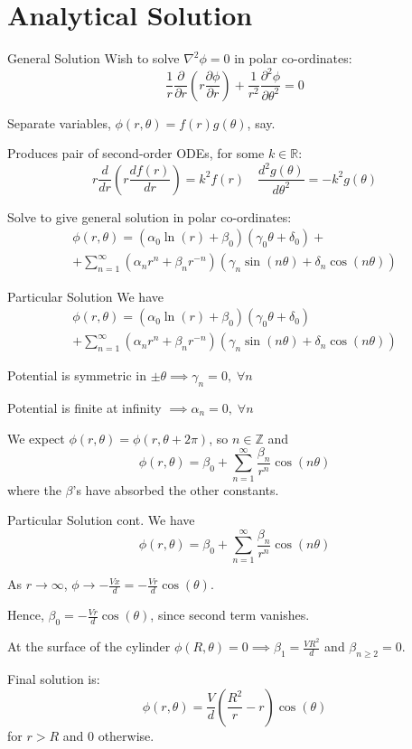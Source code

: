 \documentclass{beamer}
\newcommand{\be}{\begin{equation}}
\newcommand{\ee}{\end{equation}}
\begin{document}
\section{Analytical Solution}

\begin{frame}{General Solution}
Wish to solve $\nabla ^2 \phi = 0$ in polar co-ordinates:
%
\be
\frac{1}{r}\frac{\partial}{\partial r}(r \frac{\partial \phi}{\partial r})
+ \frac{1}{r^2}\frac{\partial ^2 \phi}{\partial \theta^2} = 0
\ee

Separate variables, $\phi(r,\theta)=f(r)g(\theta)$, say.

Produces pair of second-order ODEs, for some $k \in \mathbb{R}$:
%
\be
r\frac{d}{dr}(r \frac{df(r)}{dr}) = k^2 f(r) \quad \frac{d^2 g(\theta)}{d\theta^2} = -k^2 g(\theta)
\ee

Solve to give general solution in polar co-ordinates:
%
\begin{multline}
\phi(r, \theta) = (\alpha_0 \ln(r) + \beta_0)(\gamma_0\theta + \delta_0) + 
\\
                + \sum_{n=1}^{\infty}(\alpha_n r^n+\beta_n r^{-n})(\gamma_n \sin(n\theta) + \delta_n \cos(n\theta))
\end{multline}
\end{frame}

\begin{frame}{Particular Solution}
We have
%
\begin{multline}
\phi(r, \theta) = (\alpha_0 \ln(r) + \beta_0)(\gamma_0\theta + \delta_0) \\
                + \sum_{n=1}^{\infty}(\alpha_n r^n+\beta_n r^{-n})(\gamma_n \sin(n\theta) + \delta_n \cos(n\theta))
\end{multline}

Potential is symmetric in $\pm\theta \implies \gamma_n=0, \; \forall n$

Potential is finite at infinity $\implies \alpha_n=0, \; \forall n$

We expect $\phi(r, \theta)=\phi(r, \theta +2\pi)$, so $n \in \mathbb{Z}$ and
%
\be
\phi(r, \theta) = \beta_0 + \sum_{n=1}^{\infty} \frac{\beta_n}{r^n} \cos(n\theta)
\ee
%
where the $\beta$'s have absorbed the other constants.
\end{frame}

\begin{frame}{Particular Solution cont.}
We have
%
\be
\phi(r, \theta) = \beta_0 + \sum_{n=1}^{\infty} \frac{\beta_n}{r^n} \cos(n\theta)
\ee

As $r \rightarrow \infty$, $\phi \rightarrow -\frac{Vx}{d}=-\frac{Vr}{d}\cos(\theta)$.

Hence, $\beta_0=-\frac{Vr}{d}\cos(\theta)$, since second term vanishes.

At the surface of the cylinder $\phi(R,\theta) = 0 \implies \beta_1=\frac{VR^2}{d}$ and
$\beta_{n \geq 2} = 0$.

Final solution is:
%
\be
\phi(r, \theta) = \frac{V}{d}(\frac{R^2}{r}-r)\cos(\theta)
\ee
for $r>R$ and $0$ otherwise.

\end{frame}
\end{document}
